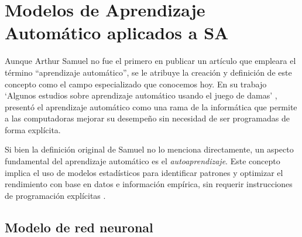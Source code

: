\documentclass[letterpaper,12pt, twoside]{report}
\providecommand{\DIFdeltex}[1]{{\protect\color{red} \scriptsize #1}} %
\providecommand{\DIFdel}[1]{\texorpdfstring{\DIFdeltex{#1}}{}} %
\begin{document}
\section{\DIFdel{Modelos de Aprendizaje Automático aplicados a SA}} %
\addtocounter{section}{-1}%
\DIFdel{Aunque Arthur Samuel no fue el primero en publicar un artículo que empleara el término ``aprendizaje automático'', se le atribuye la creación y definición de este concepto como el campo especializado que conocemos hoy. En su trabajo `Algunos estudios sobre aprendizaje automático usando el juego de damas' \cite{samuel1959}, presentó el aprendizaje automático como una rama de la informática que permite a las computadoras mejorar su desempeño sin necesidad de ser programadas de forma explícita.
}%

\DIFdel{Si bien la definición original de Samuel no lo menciona directamente, un aspecto fundamental del aprendizaje automático es el \textit{autoaprendizaje}. Este concepto implica el uso de modelos estadísticos para identificar patrones y optimizar el rendimiento con base en datos e información empírica, sin requerir instrucciones de programación explícitas \citep{Theobald2024}.
}%



\subsection{Modelo de red neuronal}
\end{document}
